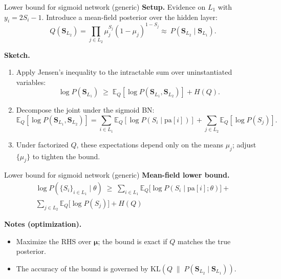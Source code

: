 \documentclass[10pt]{beamer}
\begin{document}
\begin{frame}{Lower bound for sigmoid network (generic)}
\textbf{Setup.} Evidence on $L_1$ with $y_i=2S_i-1$. Introduce a mean-field posterior over the hidden layer:
\[
Q(\mathbf{S}_{L_2})=\prod_{j\in L_2} \mu_j^{S_j}(1 - \mu_j)^{1-S_j} \approx\ P(\mathbf{S}_{L_2}\mid \mathbf{S}_{L_1}).
\]

\textbf{Sketch.}
\begin{enumerate}
  \item Apply Jensen’s inequality to the intractable sum over uninstantiated variables:
  \[
  \log P(\mathbf{S}_{L_1}) \;\ge\; \mathbb{E}_Q[\log P(\mathbf{S}_{L_1},\mathbf{S}_{L_2})] + H(Q).
  \]
  \item Decompose the joint under the sigmoid BN:
  \[
  \mathbb{E}_Q[\log P(\mathbf{S}_{L_1},\mathbf{S}_{L_2})]
  = \sum_{i\in L_1}\mathbb{E}_Q[\log P(S_i\!\mid\!\mathrm{pa}[i])]
    + \sum_{j\in L_2}\mathbb{E}_Q[\log P(S_j)].
  \]
  \item Under factorized $Q$, these expectations depend only on the means $\mu_j$; adjust $\{\mu_j\}$ to tighten the bound.
\end{enumerate}
\end{frame}

\begin{frame}{Lower bound for sigmoid network (generic)}
\textbf{Mean-field lower bound.}
\begin{multline*}
\log P(\{S_i\}_{i\in L_1}\mid \theta)
\;\ge\;
\sum_{i\in L_1}\mathbb{E}_Q\!\big[\log P(S_i\mid \mathrm{pa}[i];\theta)\big]
+ \\ \sum_{j\in L_2}\mathbb{E}_Q\!\big[\log P(S_j)\big]
+ H(Q)
\end{multline*}

\textbf{Notes (optimization).}
\begin{itemize}
  \item Maximize the RHS over $\boldsymbol{\mu}$; the bound is exact if $Q$ matches the true posterior.
  \item The accuracy of the bound   is governed by $\mathrm{KL}\!\left(Q\;\|\;P(\mathbf{S}_{L_2}\mid \mathbf{S}_{L_1})\right)$.
\end{itemize}
\end{frame}
\end{document}
